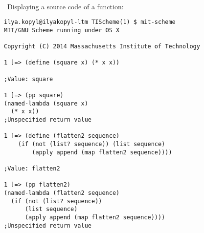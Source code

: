 \documentclass{article}
\begin{document}
\paragraph{}\
Displaying a source code of a function:
\begin{verbatim}
ilya.kopyl@ilyakopyl-ltm TIScheme(1) $ mit-scheme
MIT/GNU Scheme running under OS X

Copyright (C) 2014 Massachusetts Institute of Technology

1 ]=> (define (square x) (* x x))

;Value: square

1 ]=> (pp square)
(named-lambda (square x)
  (* x x))
;Unspecified return value

1 ]=> (define (flatten2 sequence)
	(if (not (list? sequence)) (list sequence)
		(apply append (map flatten2 sequence))))

;Value: flatten2

1 ]=> (pp flatten2)
(named-lambda (flatten2 sequence)
  (if (not (list? sequence))
      (list sequence)
      (apply append (map flatten2 sequence))))
;Unspecified return value
\end{verbatim}


\paragraph{}\
\paragraph{}\
\paragraph{}\
\paragraph{}\
\paragraph{}\
\paragraph{}\
\paragraph{}\
\paragraph{}\
\end{document}
